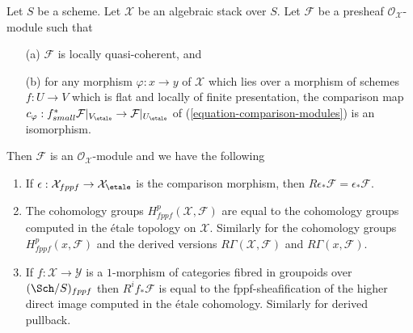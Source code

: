 \begin{lemma}
\label{lemma-compare-fppf-etale}
Let $S$ be a scheme. Let $\mathcal{X}$ be an algebraic stack over $S$.
Let $\mathcal{F}$ be a presheaf $\mathcal{O}_\mathcal{X}$-module such that
\begin{enumerate}
\item[(a)] $\mathcal{F}$ is locally quasi-coherent, and
\item[(b)] for any morphism $\varphi : x \to y$ of $\mathcal{X}$ which lies
over a morphism of schemes $f : U \to V$ which is flat and
locally of finite presentation, the comparison map
$c_\varphi : f_{small}^*\mathcal{F}|_{V_\etale} \to
\mathcal{F}|_{U_\etale}$ of
(\ref{equation-comparison-modules}) is an isomorphism.
\end{enumerate}
Then $\mathcal{F}$ is an $\mathcal{O}_\mathcal{X}$-module and
we have the following
\begin{enumerate}
\item If $\epsilon : \mathcal{X}_{fppf} \to \mathcal{X}_\etale$
is the comparison morphism, then
$R\epsilon_*\mathcal{F} = \epsilon_*\mathcal{F}$.
\item The cohomology groups $H^p_{fppf}(\mathcal{X}, \mathcal{F})$ are equal
to the cohomology groups computed in the \'etale topology on $\mathcal{X}$.
Similarly for the cohomology groups $H^p_{fppf}(x, \mathcal{F})$ and the
derived versions $R\Gamma(\mathcal{X}, \mathcal{F})$ and
$R\Gamma(x, \mathcal{F})$.
\item If $f : \mathcal{X} \to \mathcal{Y}$ is a $1$-morphism of
categories fibred in groupoids over $(\Sch/S)_{fppf}$ then
$R^if_*\mathcal{F}$ is equal to the fppf-sheafification of the
higher direct image computed in the \'etale cohomology.
Similarly for derived pullback.
\end{enumerate}
\end{lemma}

